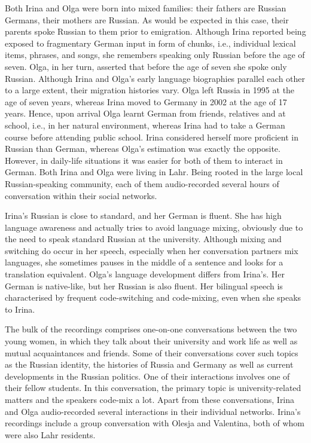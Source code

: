 Both Irina and Olga were born into mixed families: their fathers are Russian Germans, their mothers are Russian. As would be expected in this case, their parents spoke Russian to them prior to emigration. Although Irina reported being exposed to fragmentary German input in form of chunks, i.e., individual lexical items, phrases, and songs, she remembers speaking only Russian before the age of seven. Olga, in her turn, asserted that before the age of seven she spoke only Russian. Although Irina and Olga's early language biographies parallel each other to a large extent, their migration histories vary. Olga left Russia in 1995 at the age of seven years, whereas Irina moved to Germany in 2002 at the age of 17 years. Hence, upon arrival Olga learnt German from friends, relatives and at school, i.e., in her natural environment, whereas Irina had to take a German course before attending public school.
Irina considered herself more proficient in Russian than German, whereas Olga's estimation was exactly the opposite. However, in daily-life situations it was easier for both of them to interact in German. Both Irina and Olga were living in Lahr. Being rooted in the large local Russian-speaking community, each of them audio-recorded several hours of conversation within their social networks. 

Irina's Russian is close to standard, and her German is fluent. She has high language awareness and actually tries to avoid language mixing, obviously due to the need to speak standard Russian at the university. Although mixing and switching do occur in her speech, especially when her conversation partners mix languages, she sometimes pauses in the middle of a sentence and looks for a translation equivalent. Olga's language development differs from Irina's. Her German is native-like, but her Russian is also fluent. Her bilingual speech is characterised by frequent code-switching and code-mixing, even when she speaks to Irina.

The bulk of the recordings comprises one-on-one conversations between the two young women, in which they talk about their university and work life as well as mutual acquaintances and friends. Some of their conversations cover such topics as the Russian identity, the histories of Russia and Germany as well as current developments in the Russian politics. One of their interactions involves one of their fellow students. In this conversation, the primary topic is university-related matters and the speakers code-mix a lot. Apart from these conversations, Irina and Olga audio-recorded several interactions in their individual networks. Irina's recordings include a group conversation with Olesja and Valentina, both of whom were also Lahr residents.\\

